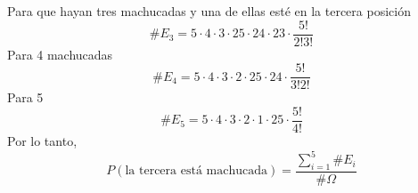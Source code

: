 \begin{enumerate}
            Para que hayan tres machucadas y una de ellas esté en la tercera posición\[\#E_3=5\cdot4\cdot3\cdot25\cdot24\cdot23\cdot\frac{5!}{2!3!}\]
            Para 4 machucadas\[\#E_4=5\cdot4\cdot3\cdot2\cdot25\cdot24\cdot\frac{5!}{3!2!}\]
            Para 5\[\#E_5=5\cdot4\cdot3\cdot2\cdot1\cdot25\cdot\frac{5!}{4!}\]
            Por lo tanto, \[P(\text{la tercera está machucada})=\frac{\sum\limits_{i=1}^5\#E_i}{\#\Omega}\]
    \end{enumerate}